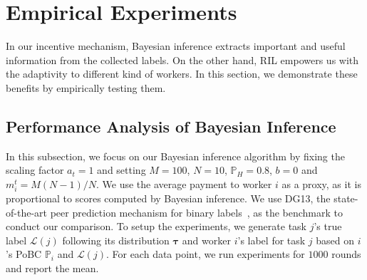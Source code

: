 \section{Empirical Experiments} 
In our incentive mechanism, Bayesian inference extracts important and useful information from the collected labels. On the other hand, RIL empowers us with the adaptivity to different kind of workers. In this section, we demonstrate these benefits by empirically testing them.


\subsection{Performance Analysis of Bayesian Inference}
In this subsection, we focus on our Bayesian inference algorithm by fixing the scaling factor $a_t=1$ and setting $M=100$, $N=10$, $\mathbb{P}_H=0.8$, $b=0$ and $m_i^t=M(N-1)/N$. 
We use the average payment to worker $i$ as a proxy, as it is proportional to scores computed by Bayesian inference. We use DG13, the state-of-the-art peer prediction mechanism for binary labels~\citep{dasgupta2013crowdsourced}, as the benchmark to conduct our comparison. To setup the experiments, we generate task $j$'s true label $\mathcal{L}(j)$ following its distribution $\bm{\tau}$ and worker $i$'s label for task $j$ based on $i$'s PoBC $\mathbb{P}_i$ and $\mathcal{L}(j)$. For each data point, we run experiments for $1000$ rounds and report the mean.

